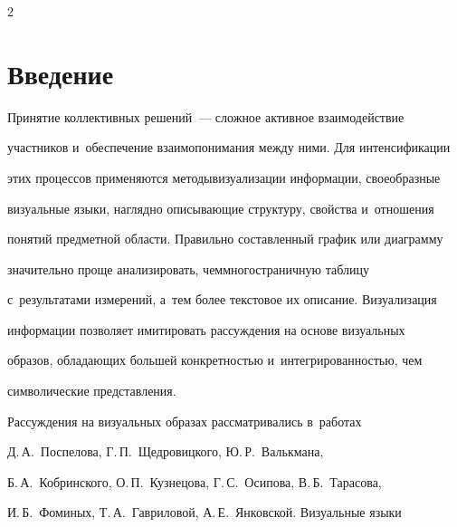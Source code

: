 




\thispagestyle{headings}





\begin{multicols}{2}





\label{st\stat}


  


\section{Введение}





  Принятие коллективных решений~--- сложное активное взаимодействие 


участников и~обеспечение взаимопонимания между ними. Для интенсификации 


этих процессов применяются методы\linebreak визуализации информации, своеобразные 


визуальные языки, наглядно описывающие структуру, свойства и~отношения 


понятий предметной об\-ласти. Правильно составленный график или диаграмму 


значительно проще анализировать, чем\linebreak мно\-го\-стра\-нич\-ную таблицу 


с~результатами измерений, а~тем более текстовое их описание. Визуализация 


информации позволяет имитировать рассужде\-ния на основе визуальных 


образов, обладающих большей конкретностью и~интегрированностью, чем 


символические представления. 


  


  Рассуждения на визуальных образах рас\-смат\-ри\-ва\-лись в~работах 


Д.\,А.~Поспелова, Г.\,П.~Щед\-ро\-виц\-ко\-го, Ю.\,Р.~Валькмана, 


Б.\,А.~Кобринского, О.\,П.~Кузнецова, Г.\,С.~Осипова, В.\,Б.~Тарасова, 


И.\,Б.~Фоминых, Т.\,А.~Гавриловой, А.\,Е.~Янковской. Визуальные языки 



\end{multicols}
